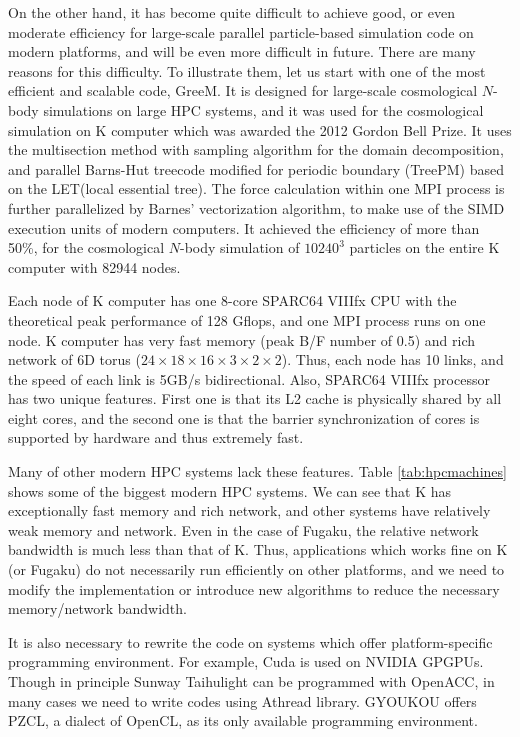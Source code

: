 On the other hand, it has become quite difficult to
achieve good, or even moderate efficiency for large-scale parallel
particle-based simulation code on modern platforms, and will be even
more difficult in future.  There are many
reasons for this difficulty. To illustrate them, let us start with one
of the most efficient and scalable code, GreeM. It is designed for
large-scale cosmological $N$-body simulations on large HPC systems,
and it was used for the cosmological simulation on K computer which
was awarded the 2012 Gordon Bell Prize. It uses the multisection
method with sampling algorithm\cite{Makino2004} for the domain
decomposition, and parallel Barns-Hut treecode modified for periodic
boundary (TreePM) based on the LET(local essential tree\cite{Salmon1990}).
The force calculation within one MPI process is further parallelized
by Barnes' vectorization algorithm, to make use of the SIMD execution
units of modern computers. It achieved the efficiency of more than
50\%, for the cosmological $N$-body simulation of $10240^3$ particles
on the entire K computer with 82944 nodes.

Each node of K computer has one 8-core SPARC64 VIIIfx CPU with the
theoretical peak performance of 128 Gflops, and one MPI process runs
on one node. K computer has very fast memory (peak B/F number of 0.5)
and rich network of 6D torus ($24\times 18 \times 16\times 3\times 2
\times 2$). Thus, each node has 10 links, and the speed of each link
is 5GB/s bidirectional. Also, 
SPARC64 VIIIfx processor has two unique features. First one is that its L2
cache is physically shared by all eight cores, and the second one is
that the barrier synchronization of cores is supported by hardware and
thus extremely fast.

Many
of other modern HPC systems lack these features. Table
\ref{tab:hpcmachines} shows some of the biggest modern HPC systems. We
can see that K has exceptionally fast memory and rich network, and
other systems have relatively weak memory and network. Even in the
case of Fugaku, the relative network bandwidth is much less than that
of K. Thus, applications which works fine on K (or Fugaku) do not
necessarily run efficiently on other platforms, and we need to modify
the implementation or introduce new algorithms to reduce the necessary
memory/network bandwidth.

It is also necessary to rewrite the
code on systems which offer platform-specific programming
environment. For example, Cuda is used on NVIDIA GPGPUs. Though in principle
Sunway Taihulight can be programmed with OpenACC,  in many
cases we need to write codes using Athread library. GYOUKOU offers
PZCL, a dialect of OpenCL, as its only available programming
environment.

